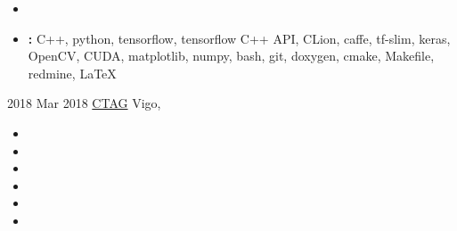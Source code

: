 \documentclass[letterpaper]{twentysecondcv} %
\newif\ifen{}
\newif\ifspa{}
\newcommand{\en}[1]{\ifen#1\fi}
\newcommand{\spa}[1]{\ifspa#1\fi}
\begin{document}
\begin{twenty}
{\begin{itemize}
{				      un Extended Kalman Filter para obtener una representación estable y fiable del
				      entorno exterior.}
			\item\en{Managed and maintained the entire core of the ADAS
				      software.}
			\item \textbf{\en{Tools}:} C++, python, tensorflow, tensorflow C++
			      API, CLion, caffe, tf-slim, keras, OpenCV, CUDA, matplotlib,
			      numpy, bash, git, doxygen, cmake, Makefile, redmine, \LaTeX{}
		\end{itemize}}
	\twentyitem
	{\en{Jan} 2018}
	{Mar 2018}
	{\en{ADAS Software Developer}}
	{\href{https://www.ctag.com/}{CTAG}}
	{Vigo, \en{Spain}}
	{\begin{itemize}
			\item\en{Worked in the beginning in an internal project as a LiDAR preprocessing developer for a self driving car.}
			\item \en{Due to my good performance and quick learning, the company transfered me to a special task force that works directly to a client.
			      }
			\item \en{Picked up the entire code base from a departing former employee and build up on that.
			      }
			\item \en{Managed, proposed and reviewed System and Software Requirements.
			      }
			\item \en{Developed and maintained software at the Client's request always with quality and before the requested deadlines.
			      }
			\item \en{Kept an efficient communication with the Client.
}
\end{itemize}}
\end{twenty}
\end{document}

